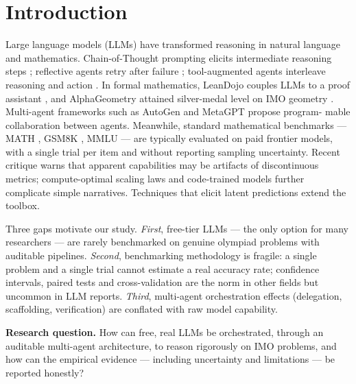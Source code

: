 \section{Introduction}
\label{sec:intro}

Large language models (LLMs) have transformed reasoning in natural language
and mathematics. Chain-of-Thought prompting elicits intermediate reasoning
steps \citep{wei_cot}; reflective agents retry after failure
\citep{shinn_reflexion}; tool-augmented agents interleave reasoning and
action \citep{yao_react}. In formal mathematics, LeanDojo couples LLMs to a
proof assistant \citep{yang_leandojo}, and AlphaGeometry attained silver-medal
level on IMO geometry \citep{alpha_geometry}. Multi-agent frameworks such as
AutoGen \citep{wu_autogen} and MetaGPT \citep{hong_metagpt} propose program-
mable collaboration between agents. Meanwhile, standard mathematical
benchmarks --- MATH \citep{hendrycks_math}, GSM8K \citep{cobbe_gsm8k}, MMLU
\citep{hendrycks_mmlu} --- are typically evaluated on paid frontier models,
with a single trial per item and without reporting sampling uncertainty.
Recent critique \citep{schaeffer_mirage} warns that apparent capabilities may
be artifacts of discontinuous metrics; compute-optimal scaling laws
\citep{hoffmann_chinchilla} and code-trained models \citep{chen_codex}
further complicate simple narratives. Techniques that elicit latent
predictions \citep{ryoo_eliciting} extend the toolbox.

Three gaps motivate our study. \emph{First}, free-tier LLMs --- the only
option for many researchers --- are rarely benchmarked on genuine olympiad
problems with auditable pipelines. \emph{Second}, benchmarking methodology is
fragile: a single problem and a single trial cannot estimate a real accuracy
rate; confidence intervals, paired tests and cross-validation are the norm in
other fields but uncommon in LLM reports. \emph{Third}, multi-agent
orchestration effects (delegation, scaffolding, verification) are conflated
with raw model capability.

\textbf{Research question.} How can free, real LLMs be orchestrated, through an
auditable multi-agent architecture, to reason rigorously on IMO problems, and
how can the empirical evidence --- including uncertainty and limitations --- be
reported honestly?

